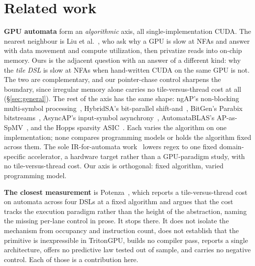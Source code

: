 \documentclass[sigplan,screen,review,anonymous]{acmart}
\begin{document}
\section{Related work}\label{sec:related}
\textbf{GPU automata} form an \emph{algorithmic} axis, all single-implementation CUDA. The
nearest neighbour is Liu et al.~\cite{whyslownfa2020}, who ask why a GPU is slow at NFAs and
answer with data movement and compute utilization, then privatize reads into on-chip memory.
Ours is the adjacent question with an answer of a different kind: why the \emph{tile DSL} is
slow at NFAs when hand-written CUDA on the same GPU is not. The two are complementary, and
our pointer-chase control sharpens the boundary, since irregular memory alone carries no
tile-versus-thread cost at all (\S\ref{sec:general}). The rest of the axis has the same
shape: ngAP's non-blocking multi-symbol processing~\cite{ngap2024}, HybridSA's bit-parallel
shift-and~\cite{hybridsa2024}, BitGen's Parabix bitstreams~\cite{bitgen2025}, AsyncAP's
input-symbol asynchrony~\cite{asyncap2023}, AutomataBLAS's AP-as-SpMV~\cite{automatablas2025},
and the Hopps sparsity ASIC~\cite{hopps2025}. Each varies the algorithm on one
implementation; none compares programming models or holds the algorithm fixed across them.
The sole IR-for-automata work~\cite{mlirregex2025} lowers regex to one fixed
domain-specific accelerator, a hardware target rather than a GPU-paradigm study, with no
tile-versus-thread cost. Our axis is orthogonal: fixed algorithm, varied programming model.

\textbf{The closest measurement} is Potenza~\cite{twofaces2026}, which reports a
tile-versus-thread cost on automata across four DSLs at a fixed algorithm and argues that
the cost tracks the execution paradigm rather than the height of the abstraction, naming
the missing per-lane control in prose. It stops there. It does not isolate the mechanism
from occupancy and instruction count, does not establish that the primitive is
inexpressible in TritonGPU, builds no compiler pass, reports a single architecture, offers
no predictive law tested out of sample, and carries no negative control. Each of those is a
contribution here.
\end{document}
